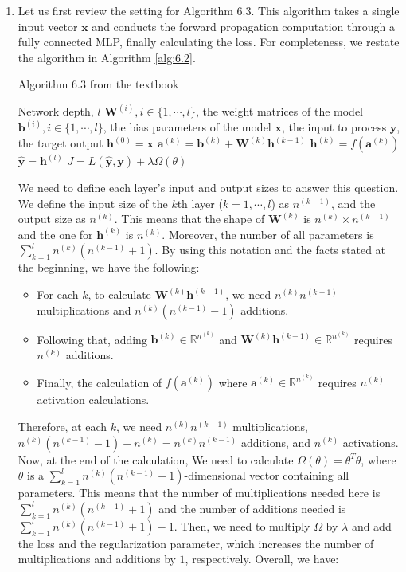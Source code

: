 \documentclass[
	12pt, %
]{../Template/fphw}
\newcommand{\x}{\mathbf{x}}
\renewcommand{\b}{\mathbf{b}}
\newcommand{\y}{\mathbf{y}}
\newcommand{\h}{\mathbf{h}}
\renewcommand{\a}{\mathbf{a}}
\newcommand{\W}{\mathbf{W}}
\begin{document}
\begin{enumerate}[label=(\arabic*)]
    \item Let us first review the setting for Algorithm 6.3. This algorithm takes a single input vector $\x$ and conducts the forward propagation computation through a fully connected MLP, finally calculating the loss. For completeness, we restate the algorithm in Algorithm \ref{alg:6.2}.

    \begin{algorithm}
    \caption{Algorithm 6.3 from the textbook}\label{alg:6.2}
        \begin{algorithmic}
            \Require Network depth, $l$
            \Require $\W^{(i)}, i\in \{1,\cdots, l\}$, the weight matrices of the model
            \Require $\b^{(i)}, i\in \{1,\cdots,l\}$, the bias parameters of the model
            \Require $\x$, the input to process
            \Require $\y$, the target output
            \State $\h^{(0)} =\x$
                \State $\a^{(k)} = \b^{(k)} +\W^{(k)}\h^{(k-1)}$
                \State $\h^{(k)} = f(\a^{(k)})$
            \EndFor
            \State $\hat{\y} = \h^{(l)}$
            \State $J=L(\hat{\y},\y)+\lambda \Omega(\theta)$
        \end{algorithmic}
    \end{algorithm}
We need to define each layer's input and output sizes to answer this question. We define the input size of the $k$th layer ($k=1,\cdots ,l$) as $n^{(k-1)}$, and the output size as $n^{(k)}$. This means that the shape of $\W^{(k)}$ is $n^{(k)}\times n^{(k-1)}$ and the one for $\h^{(k)}$ is $n^{(k)}$. Moreover, the number of all parameters is $\sum_{k=1}^{l}n^{(k)}(n^{(k-1)}+1)$. By using this notation and the facts stated at the beginning, we have the following:
\begin{itemize}
    \item For each $k$, to calculate $\W^{(k)}\h^{(k-1)}$, we need $n^{(k)}n^{(k-1)}$ multiplications and $n^{(k)}(n^{(k-1)}-1)$ additions.
    \item Following that, adding $\b^{(k)}\in \mathbb{R}^{n^{(k)}}$ and $\W^{(k)}\h^{(k-1)}\in \mathbb{R}^{n^{(k)}}$ requires $n^{(k)}$ additions.
    \item Finally, the calculation of $f(\a^{(k)})$ where $\a^{(k)}\in \mathbb{R}^{n^{(k)}}$ requires $n^{(k)}$ activation calculations.
\end{itemize}
Therefore, at each $k$, we need $n^{(k)}n^{(k-1)}$ multiplications, $n^{(k)}(n^{(k-1)}-1) + n^{(k)} = n^{(k)}n^{(k-1)}$ additions, and $n^{(k)}$ activations. Now, at the end of the calculation, We need to calculate $\Omega(\theta)=\theta^T \theta$, where $\theta$ is a $\sum_{k=1}^{l}n^{(k)}(n^{(k-1)}+1)$-dimensional vector containing all parameters. This means that the number of multiplications needed here is $\sum_{k=1}^{l}n^{(k)}(n^{(k-1)}+1)$ and the number of additions needed is $\sum_{k=1}^{l}n^{(k)}(n^{(k-1)}+1)-1$. Then, we need to multiply $\Omega$ by $\lambda$ and add the loss and the regularization parameter, which increases the number of multiplications and additions by $1$, respectively. Overall, we have:

\end{enumerate}
\end{document}
